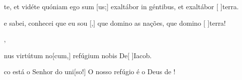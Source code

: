 {  {\item {}te, et vidéte quóniam ego sum [us;] exaltábor in géntibus, et exaltábor [ ]{ter}ra.~\Antiphona}%
    {\item {} e sabei, conhecei que eu sou [,] que domino as nações, que domino [ ]{ter}ra!~\Antiphona},
  {\item {}nus virtútum no[cum,] refúgium nobis De\-[ ]{Ia}cob.~\Antiphona}%
    {\item {}co está o Senhor do uni[so!] O nosso refúgio é o Deus de !~\Antiphona}
}